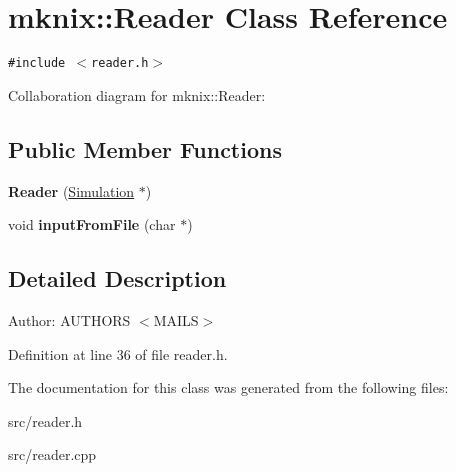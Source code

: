 \hypertarget{classmknix_1_1Reader}{
\section{mknix::Reader Class Reference}
\label{classmknix_1_1Reader}
}
{\tt \#include $<$reader.h$>$}

Collaboration diagram for mknix::Reader:\subsection*{Public Member Functions}
\begin{CompactItemize}
\item 
\hypertarget{classmknix_1_1Reader_f306d09fdfcd3675ae6c23aa2d5c1ece}{
\textbf{Reader} (\hyperlink{classmknix_1_1Simulation}{Simulation} $\ast$)}
\label{classmknix_1_1Reader_f306d09fdfcd3675ae6c23aa2d5c1ece}

\item 
\hypertarget{classmknix_1_1Reader_b8ac24c56853e5101ac4f2a94d172392}{
void \textbf{inputFromFile} (char $\ast$)}
\label{classmknix_1_1Reader_b8ac24c56853e5101ac4f2a94d172392}

\end{CompactItemize}


\subsection{Detailed Description}
\begin{Desc}
\item[Author:]AUTHORS $<$MAILS$>$ \end{Desc}


Definition at line 36 of file reader.h.

The documentation for this class was generated from the following files:\begin{CompactItemize}
\item 
src/reader.h\item 
src/reader.cpp\end{CompactItemize}
